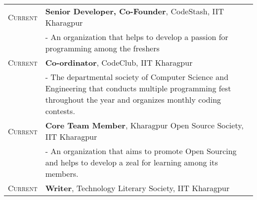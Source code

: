 \documentclass[a4paper,10pt]{extarticle} %
\begin{document}
\begin{tabular}{r|p{17.5cm}}
\textsc{Current} & \textbf{Senior Developer, Co-Founder}, CodeStash, IIT Kharagpur \\
& - \space An organization that helps to develop a passion for programming among the freshers\\
\textsc{Current} & \textbf{Co-ordinator}, CodeClub, IIT Kharagpur \\
& - \space The departmental society of Computer Science and Engineering that conducts multiple programming fest throughout the year and organizes monthly coding contests. \\
\textsc{Current} & \textbf{Core Team Member}, Kharagpur Open Source Society, IIT Kharagpur \\
& - \space An organization that aims to promote Open Sourcing and helps to develop a zeal for learning among its members. \\
\textsc{Current} & \textbf{Writer}, Technology Literary Society, IIT Kharagpur \\
\end{tabular}



\end{document}
